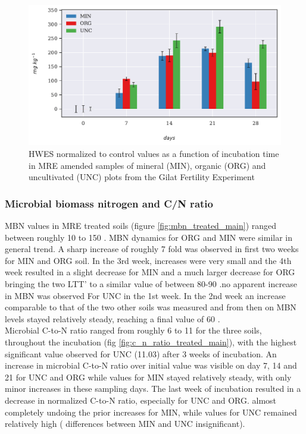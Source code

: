 			\begin{figure}[H]
				\centering
				\includegraphics[scale=0.8, width=\linewidth]{thesis_figures/main_incubation/control_normalized/HWES.pdf}
				\caption{HWES normalized to control values as a function of incubation time in MRE amended samples of mineral (MIN), organic (ORG) and uncultivated (UNC) plots from the Gilat Fertility Experiment}
				\label{fig:hwes_control_normalized_treated_main}
			\end{figure}

		\subsubsection{Microbial biomass nitrogen and C/N ratio}
			MBN values in MRE treated soils (figure \ref{fig:mbn_treated_main}) ranged between roughly 10 to 150 \genericunit. MBN dynamics for ORG and MIN were similar in general trend. A sharp increase of roughly  7 fold was observed in first two weeks for MIN and ORG soil. In the 3rd week, increases were very small and the 4th week resulted in a slight decrease for MIN and a much larger decrease for ORG bringing the two LTT’ to a similar value of between 80-90 \genericunit.no apparent increase in MBN was observed For UNC in the 1st week. In the 2nd week an increase comparable to that of the two other soils was measured and from then on MBN levels stayed relatively steady, reaching a final value of 60 \genericunit.\\
			Microbial C-to-N ratio ranged from roughly 6 to 11 for the three soils,  throughout the incubation (fig \ref{fig:c_n_ratio_treated_main}), with the highest significant value observed for UNC (11.03) after 3 weeks of incubation.
			An increase in microbial C-to-N ratio over initial value was visible on day 7, 14 and 21 for UNC and ORG while values for MIN stayed relatively steady, with only minor increases in these sampling days. The last week of incubation resulted in a decrease in normalized C-to-N ratio,  especially for UNC and ORG. almost completely undoing the prior increases for MIN, while values for UNC remained relatively high ( differences between MIN and UNC insignificant).

